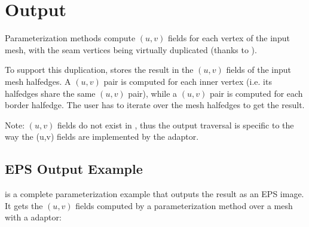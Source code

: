 \section{Output}

Parameterization methods compute $(u,v)$ fields for each vertex
of the input mesh, with the seam vertices being virtually duplicated (thanks
to ).

To support this duplication,
 stores
the result in the $(u,v)$ fields of the input mesh halfedges.
A $(u,v)$ pair is computed for
each inner vertex (i.e. its halfedges share the same $(u,v)$ pair),
while a $(u,v)$ pair is computed for each border halfedge.
The user has to iterate over the mesh halfedges to get the result.

Note: $(u,v)$ fields do not exist in ,
thus the output traversal is specific to the way the (u,v) fields are implemented by the adaptor.

\subsection{EPS Output Example}

 is a complete parameterization
example that outputs the result as an EPS image.
It gets the $(u,v)$ fields computed by a
parameterization method over a  mesh with a
 adaptor:


